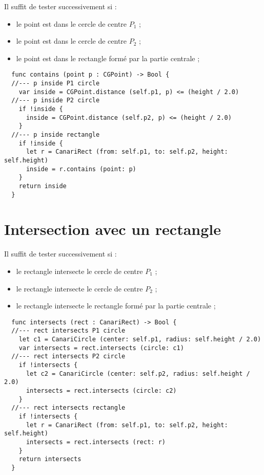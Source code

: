 Il suffit de tester successivement si :
\begin{itemize}
  \item le point est dans le cercle de centre $P_1$ ;
  \item le point est dans le cercle de centre $P_2$ ;
  \item le point est dans le rectangle formé par la partie centrale ;
\end{itemize}

\begin{lstlisting}
  func contains (point p : CGPoint) -> Bool {
  //--- p inside P1 circle
    var inside = CGPoint.distance (self.p1, p) <= (height / 2.0)
  //--- p inside P2 circle
    if !inside {
      inside = CGPoint.distance (self.p2, p) <= (height / 2.0)
    }
  //--- p inside rectangle
    if !inside {
      let r = CanariRect (from: self.p1, to: self.p2, height: self.height)
      inside = r.contains (point: p)
    }
    return inside
  }
\end{lstlisting}










\section{Intersection avec un rectangle}

Il suffit de tester successivement si :
\begin{itemize}
  \item le rectangle intersecte le cercle de centre $P_1$ ;
  \item le rectangle intersecte le cercle de centre $P_2$ ;
  \item le rectangle intersecte le rectangle formé par la partie centrale ;
\end{itemize}

\begin{lstlisting}
  func intersects (rect : CanariRect) -> Bool {
  //--- rect intersects P1 circle
    let c1 = CanariCircle (center: self.p1, radius: self.height / 2.0)
    var intersects = rect.intersects (circle: c1)
  //--- rect intersects P2 circle
    if !intersects {
      let c2 = CanariCircle (center: self.p2, radius: self.height / 2.0)
      intersects = rect.intersects (circle: c2)
    }
  //--- rect intersects rectangle
    if !intersects {
      let r = CanariRect (from: self.p1, to: self.p2, height: self.height)
      intersects = rect.intersects (rect: r)
    }
    return intersects
  }
\end{lstlisting}






